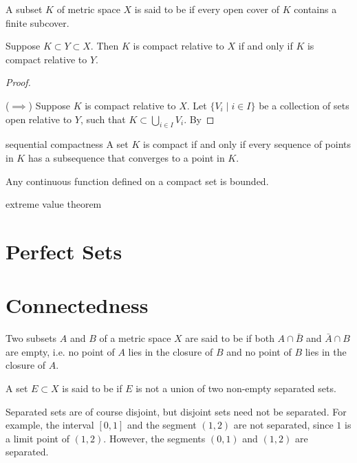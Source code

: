 \begin{definition}[Compactness]
A subset $K$ of metric space $X$ is said to be  if every open cover of $K$ contains a finite subcover.
\end{definition}

\begin{proposition}
Suppose $K\subset Y\subset X$. Then $K$ is compact relative to $X$ if and only if $K$ is compact relative to $Y$.
\end{proposition}

\begin{proof} \

($\implies$) Suppose $K$ is compact relative to $X$. Let $\{V_i\mid i\in I\}$ be a collection of sets open relative to $Y$, such that $K\subset\bigcup_{i\in I}V_i$. By 
\end{proof}

sequential compactness
A set $K$ is compact if and only if every sequence of points in $K$ has a subsequence that converges to a point in $K$.

Any continuous function defined on a compact set is bounded.

extreme value theorem

\section{Perfect Sets}


\section{Connectedness}
\begin{definition}
Two subsets $A$ and $B$ of a metric space $X$ are said to be  if both $A\cap\bar{B}$ and $\bar{A}\cap B$ are empty, i.e. no point of $A$ lies in the closure of $B$ and no point of $B$ lies in the closure of $A$.

A set $E\subset X$ is said to be  if $E$ is not a union of two non-empty separated sets. 
\end{definition}

\begin{remark}
Separated sets are of course disjoint, but disjoint sets need not be separated. For example, the interval $[0,1]$ and the segment $(1,2)$ are not separated, since $1$ is a limit point of $(1,2)$. However, the segments $(0,1)$ and $(1,2)$ are separated.
\end{remark}

